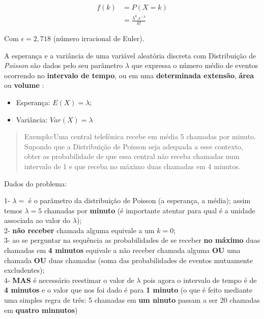 \documentclass[
]{book}
\providecommand{\tightlist}{%
  \setlength{\itemsep}{0pt}\setlength{\parskip}{0pt}}
\begin{document}
\hfill\break

\begin{align*}
f(k) & = P(X=k) \\
     & = \frac{\lambda^{k}. \epsilon^{-\lambda}} {k!} 
\end{align*}

Com \(\epsilon= 2,718\) (número irracional de Euler).

\hfill\break

A esperança e a variância de uma variável aleatória discreta com Distribuição de \emph{Poisson} são dados pelo seu parãmetro \(\lambda\) que expressa o número médio de eventos ocorrendo no \textbf{intervalo de tempo}, ou em uma \textbf{determinada extensão}, \textbf{área} ou \textbf{volume} :

\begin{itemize}
\tightlist
\item
  Esperança: \(E(X) = \lambda\);\\
\item
  Variância: \(Var(X) = \lambda\)
\end{itemize}

\hfill\break

\begin{quote}
Exemplo:Uma central telefônica recebe em média 5 chamadas por minuto. Supondo que a Distribuição de Poisson seja adequada a esse contexto, obter as probabilidade de que essa central não receba chamadas num intervalo de 1 e que receba no máximo duas chamadas em 4 minutos.
\end{quote}

\hfill\break

Dados do problema:

1- \(\lambda=\) é o parãmetro da distribuição de Poisson (a esperança, a média); assim temos \(\lambda=5\) chamadas por \textbf{minuto} (é importante atentar para qual é a unidade associada ao valor do \(\lambda\));\\
2- \textbf{não receber} chamada alguma equivale a um \(k=0\);\\
3- ao se perguntar na sequência as probabilidades de se receber \textbf{no máximo} duas chamadas em \textbf{4 minutos} equivale a não receber chamada alguma \textbf{OU} uma chamada \textbf{OU} duas chamadas (soma das probabilidades de eventos mutuamente excludentes);\\
4- \textbf{MAS} é necessário reestimar o valor de \(\lambda\) pois agora o intervalo de tempo é de \textbf{4 minutos} e o valor que nos foi dado é para \textbf{1 minuto} (o que é feito mediante uma simples regra de três: 5 chamadas em \textbf{um ninuto} passam a ser 20 chamadas em \textbf{quatro minnutos})
\end{document}
